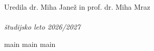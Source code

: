 \documentclass[graybox, envcountchap]{svmult}
\begin{document}
\large Uredila dr. Miha Janež in prof. dr. Miha Mraz\\
\\
\normalsize \emph{študijsko leto 2026/2027}




\tableofcontents

{main}
{main}
{main}

\backmatter

\end{document}
